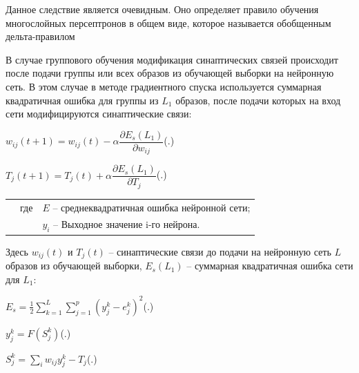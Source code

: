 	\par \redline Данное следствие является очевидным. Оно определяет правило обучения многослойных персептронов в общем виде, которое называется обобщенным дельта-правилом
	
	\par \redline В случае группового обучения модификация синаптических связей происходит после подачи группы или всех образов из обучающей выборки на нейронную сеть. В этом случае в методе градиентного спуска используется суммарная квадратичная ошибка для группы из $L_1$ образов, после подачи которых на вход сети модифицируются синаптические связи:
	
	\formulaspace \par \redline 
	$w_{ij}(t+1) = w_{ij}(t) - \alpha \dfrac{\partial E_s (L_1)}{\partial w_{ij}} $\hfill (\thechaptercntr .\theformulacntr) \redline
	\formulaspace \addtocounter{formulacntr}{1}
	
	\formulaspace \par \redline 
	$T_{j}(t+1) = T_{j}(t) + \alpha \dfrac{\partial E_s (L_1)}{\partial T_{j}} $\hfill (\thechaptercntr .\theformulacntr) \redline
	\formulaspace \addtocounter{formulacntr}{1}
	
	\begin{tabular}{p{}p{}p{}}
		& где  & $E$ {--} среднеквадратичная ошибка нейронной сети; \\
		&      & $y_{i}$ {--} Выходное значение i-го нейрона. \\
	\end{tabular}
	
	Здесь $w_{ij}(t)$ и $T_{j}(t)$ – синаптические связи до подачи на нейронную сеть $L$ образов из обучающей выборки, $E_s (L_1)$ – суммарная квадратичная ошибка сети для $L_1$:
	
	\formulaspace \par \redline 
	$E_{s} = \frac{1}{2} \sum \limits _{k=1}^{L} \sum \limits _{j=1}^{p} (y_{j}^{k} - e_{j}^{k})^{2} $\hfill (\thechaptercntr .\theformulacntr) \redline
	\formulaspace \addtocounter{formulacntr}{1}
	
		\formulaspace \par \redline 
	$y_{j}^{k} = F(S_{j}^{k}) $\hfill (\thechaptercntr .\theformulacntr) \redline
	\formulaspace \addtocounter{formulacntr}{1}
	
		\formulaspace \par \redline 
	$S_{j}^{k} = \sum \limits _{i}^{} w_{ij}y_{j}^{k} - T_{j}$\hfill (\thechaptercntr .\theformulacntr) \redline
	\formulaspace \addtocounter{formulacntr}{1}
	
